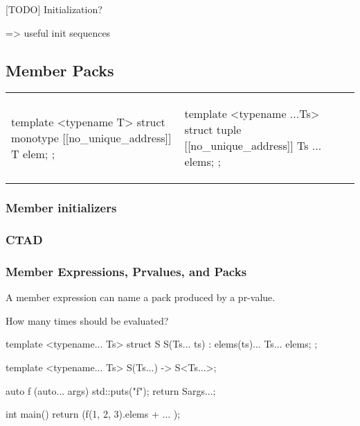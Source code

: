\documentclass{wg21}
\begin{document}
[TODO]
Initialization?

=> useful init sequences

\subsection{Member Packs}

\begin{center}
\begin{tabular}{l|l}
\begin{minipage}[t]{0.5\textwidth}
\begin{colorblock}
template <typename T>
struct monotype {
    [[no_unique_address]] T elem;
};
\end{colorblock}
\end{minipage}
&
\begin{minipage}[t]{0.5\textwidth}
\begin{colorblock}
template <typename ...Ts>
struct tuple{
    [[no_unique_address]] Ts ... elems;
};
\end{colorblock}
\end{minipage}
\\
\end{tabular}
\end{center}

\subsubsection{Member initializers}

\subsubsection{CTAD}

\subsubsection{Member Expressions, Prvalues, and Packs}

A member expression can name a pack produced by a pr-value.

How many times should  be evaluated?

\begin{colorblock}
template <typename... Ts>
struct S {
    S(Ts... ts) : elems(ts)... {}
    Ts... elems;
};

template <typename... Ts>
S(Ts...) -> S<Ts...>;

auto f (auto... args) {
    std::puts("f");
    return S{args...};
}

int main() {
    return (f(1, 2, 3).elems + ... );
}
\end{colorblock}
\end{document}
